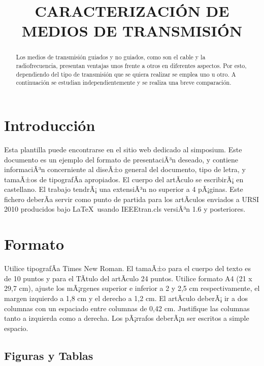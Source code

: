 \documentclass[10pt,conference,a4paper]{IEEEtran}%
\begin{document}
\title{CARACTERIZACIÓN DE MEDIOS DE TRANSMISIÓN}
\author{
     }
\maketitle

\begin{abstract}
    Los medios de transmisión guiados y no guiados, como son el cable y la radiofrecuencia, presentan ventajas unos frente a otros en diferentes aspectos. Por esto, dependiendo del tipo de transmisión que se quiera realizar se emplea uno u otro. A continuación se estudian independientemente y se realiza una breve comparación.
\end{abstract}

\section{Introducción}

Esta plantilla puede encontrarse en el sitio web dedicado al simposium. Este
documento es un ejemplo del formato de presentaciÃ³n deseado, y contiene
informaciÃ³n concerniente al diseÃ±o general del documento, tipo de letra, y
tamaÃ±os de tipografÃ­a apropiados. El cuerpo del artÃ­culo se escribirÃ¡ en
castellano. El trabajo tendrÃ¡ una extensiÃ³n no superior a 4 pÃ¡ginas. Este
fichero deberÃ­a servir como punto de partida para los artÃ­culos enviados a
URSI 2010 producidos bajo \LaTeX\ usando IEEEtran.cls versiÃ³n 1.6 y posteriores.

\section{Formato}

Utilice tipografÃ­a Times New Roman. El tamaÃ±o para el cuerpo del texto es de
10 puntos y para el TÃ­tulo del artÃ­culo 24 puntos. Utilice formato A4 (21 x
29,7 cm), ajuste los mÃ¡rgenes superior e inferior a 2 y 2,5 cm
respectivamente, el margen izquierdo a 1,8 cm y el derecho a 1,2 cm. El
artÃ­culo deberÃ¡ ir a dos columnas con un espaciado entre columnas de 0,42 cm.
Justifique las columnas tanto a izquierda como a derecha. Los pÃ¡rrafos deberÃ¡n
ser escritos a simple espacio.

\subsection{Figuras y Tablas}
\end{document}
